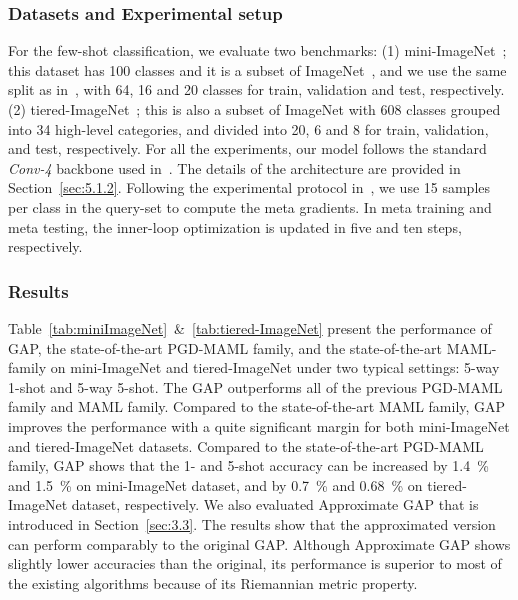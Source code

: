 \subsubsection{Datasets and Experimental setup}
For the few-shot classification, we evaluate two benchmarks:
(1) mini-ImageNet~\cite{vinyals2016matching}; this dataset has 100 classes and it is a subset of ImageNet~\cite{russakovsky2015imagenet}, and we use the same split as in~\cite{ravi2016optimization}, with 64, 16 and 20 classes for train, validation and test, respectively. (2) tiered-ImageNet~\cite{ren2018meta}; this is also a subset of ImageNet with 608 classes grouped into 34 high-level categories, and divided into 20, 6 and 8 for train, validation, and test, respectively.
For all the experiments, our model follows the standard \textit{Conv-4} backbone used in~\cite{vinyals2016matching}.
The details of the architecture are provided in Section~\ref{sec:5.1.2}.
Following the experimental protocol in~\cite{finn2017model}, we use 15 samples per class in the query-set to compute the meta gradients. In meta training and meta testing, the inner-loop optimization is updated in five and ten steps, respectively.

\subsubsection{Results}
Table~\ref{tab:miniImageNet}~\&~\ref{tab:tiered-ImageNet} present the performance of GAP, the state-of-the-art PGD-MAML family, and the state-of-the-art MAML-family on mini-ImageNet and tiered-ImageNet under two typical settings: 5-way 1-shot and 5-way 5-shot. 
The GAP outperforms all of the previous PGD-MAML family and MAML family. 
Compared to the state-of-the-art MAML family, GAP improves the performance with a quite significant margin for both mini-ImageNet and tiered-ImageNet datasets.
Compared to the state-of-the-art PGD-MAML family, GAP shows that the 1- and 5-shot accuracy can be increased by 1.4~\% and 1.5~\% on mini-ImageNet dataset, and by 0.7~\% and 0.68~\% on tiered-ImageNet dataset, respectively. 
We also evaluated Approximate GAP that is introduced in Section~\ref{sec:3.3}. 
The results show that the approximated version can perform comparably to the original GAP. 
Although Approximate GAP shows slightly lower accuracies than the original,  its performance is superior to most of the existing algorithms because of its Riemannian metric property.

